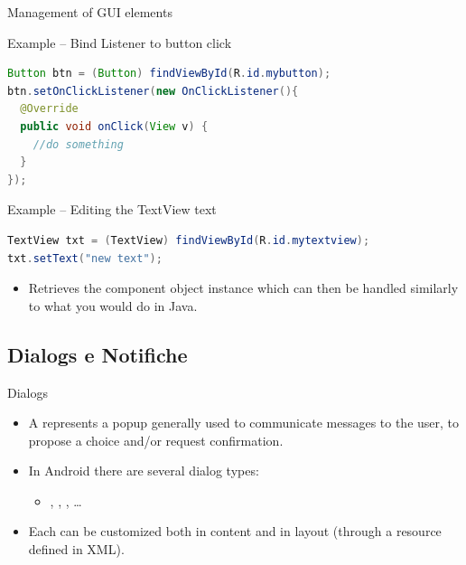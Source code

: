 \documentclass{beamer}
\begin{document}
\begin{frame}{Management of GUI elements}
    \begin{exampleblock}{Example -- Bind Listener to button click}
      \begin{lstlisting}[language=Java]  		        
Button btn = (Button) findViewById(R.id.mybutton);
btn.setOnClickListener(new OnClickListener(){	
  @Override
  public void onClick(View v) {
    //do something
  }	
});
      \end{lstlisting}
    \end{exampleblock}

    \begin{exampleblock}{Example -- Editing the TextView text}
      \begin{lstlisting}[language=Java]  		        
TextView txt = (TextView) findViewById(R.id.mytextview);
txt.setText("new text");
      \end{lstlisting}
    \end{exampleblock}
    \begin{small}
      \begin{itemize}
        \item Retrieves the component object instance which can then be handled
        similarly to what you would do in Java.
      \end{itemize}
    \end{small}
  \end{frame}

\subsection{Dialogs e Notifiche}

  \begin{frame}{Dialogs}
    \begin{itemize}\itemsep10pt
      \item A  represents a popup generally used to communicate
      messages to the user, to propose a choice and/or request confirmation. 
      \item In Android there are several dialog types:
      \begin{itemize}
        \item {}, ,
        , \dots
      \end{itemize}
      \item Each can be customized both in content and in layout (through a
      resource defined in XML).
    \end{itemize}
    \vfill
  \end{frame}
\end{document}
